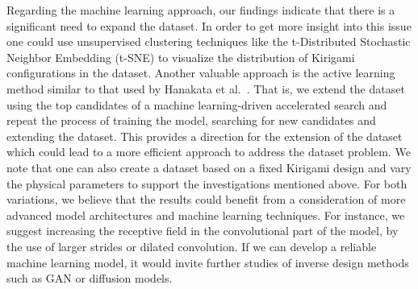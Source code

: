 Regarding the machine learning approach, our findings indicate that there is a
significant need to expand the dataset. In order to get more insight into this
issue one could use unsupervised clustering techniques like the t-Distributed
Stochastic Neighbor Embedding (t-SNE) to visualize the distribution of Kirigami
configurations in the dataset. Another valuable approach is the active learning
method similar to that used by Hanakata et al.~\cite{PhysRevLett.121.255304}.
That is, we extend the dataset using the top candidates of a machine
learning-driven accelerated search and repeat the process of training the model,
searching for new candidates and extending the dataset. This provides a
direction for the extension of the dataset which could lead to a more efficient
approach to address the dataset problem. We note that one can also create a dataset based on a fixed Kirigami design and vary the physical parameters to support the investigations mentioned above. For both variations, we believe that the results could benefit from a consideration of more advanced model architectures and machine learning techniques. For instance, we suggest increasing the receptive field in the convolutional part of the model, by the use of larger strides or dilated convolution. If we can develop a reliable machine learning model, it would invite further studies of inverse design methods such as \acrshort{GAN} or diffusion models. 

